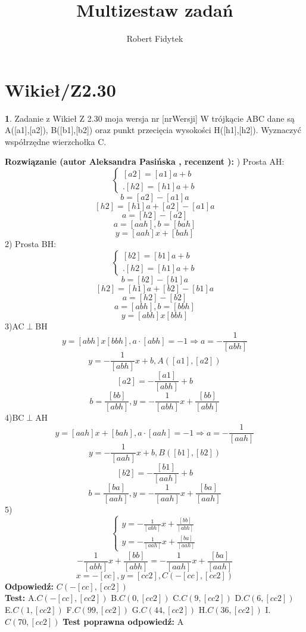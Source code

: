 \documentclass[12pt, a4paper]{article}
\title{Multizestaw zadań}
\author{Robert Fidytek}
\date{}
\theoremstyle{definition} %
\newtheorem{zad}{}
\newcommand{\kategoria}[1]{\section{#1}} %
\newcommand{\zadStart}[1]{\begin{zad}#1\newline} %
\newcommand{\zadStop}{\end{zad}}   %
\newcommand{\rozwStart}[2]{\noindent \textbf{Rozwiązanie (autor #1 , recenzent #2): }\newline} %
\newcommand{\rozwStop}{\newline}                                            %
\newcommand{\odpStart}{\noindent \textbf{Odpowiedź:}\newline}    %
\newcommand{\odpStop}{\newline}                                             %
\newcommand{\testStart}{\noindent \textbf{Test:}\newline} %
\newcommand{\testStop}{\newline} %
\newcommand{\kluczStart}{\noindent \textbf{Test poprawna odpowiedź:}\newline} %
\newcommand{\kluczStop}{\newline} %
\begin{document}
\maketitle


\kategoria{Wikieł/Z2.30}
\zadStart{Zadanie z Wikieł Z 2.30 moja wersja nr [nrWersji]}
W trójkącie ABC dane są A([a1],[a2]), B([b1],[b2]) oraz punkt przecięcia wysokości H([h1],[h2]). Wyznaczyć współrzędne wierzchołka C.
\zadStop
\rozwStart{Aleksandra Pasińska}{}
1) Prosta AH:
$$\left\{ \begin{array}{ll}
[a2]=[a1]a+b\\ 
.[h2]=[h1]a+b 
\end{array} \right.$$
$$b=[a2]-[a1]a$$
$$[h2]=[h1]a+[a2]-[a1]a$$
$$a=[h2]-[a2]$$
$$a=[aah], b=[bah]$$
$$y=[aah]x+[bah]$$
2) Prosta BH:
$$\left\{ \begin{array}{ll}
[b2]=[b1]a+b\\ 
.[h2]=[h1]a+b 
\end{array} \right.$$
$$b=[b2]-[b1]a$$
$$[h2]=[h1]a+[b2]-[b1]a$$
$$a=[h2]-[b2]$$
$$a=[abh], b=[bbh]$$
$$y=[abh]x[bbh]$$
3)AC$\perp$BH
$$y=[abh]x[bbh],a\cdot [abh]=-1\Rightarrow a=-\frac{1}{[abh]}$$
$$y=-\frac{1}{[abh]}x+b, A([a1],[a2])$$
$$[a2]=-\frac{[a1]}{[abh]}+b$$
$$b=\frac{[bb]}{[abh]},y=-\frac{1}{[abh]}x+\frac{[bb]}{[abh]}$$
4)BC$\perp$AH
$$y=[aah]x+[bah],a\cdot [aah]=-1\Rightarrow a=-\frac{1}{[aah]}$$
$$y=-\frac{1}{[aah]}x+b, B([b1],[b2])$$
$$[b2]=-\frac{[b1]}{[aah]}+b$$
$$b=\frac{[ba]}{[aah]},y=-\frac{1}{[aah]}x+\frac{[ba]}{[aah]}$$
5) $$\left\{ \begin{array}{ll}
y=-\frac{1}{[abh]}x+\frac{[bb]}{[abh]}\\ 
y=-\frac{1}{[aah]}x+\frac{[ba]}{[aah]}
\end{array} \right.$$
$$-\frac{1}{[abh]}x+\frac{[bb]}{[abh]}=-\frac{1}{[aah]}x+\frac{[ba]}{[aah]}$$
$$x=-[cc], y=[cc2], C(-[cc],[cc2])$$
\rozwStop
\odpStart
$C(-[cc],[cc2])$\\
\odpStop
\testStart
A.$ C(-[cc],[cc2])$
B.$ C(0,[cc2])$
C.$ C(9,[cc2])$
D.$ C(6,[cc2])$
E.$ C(1,[cc2])$
F.$ C(99,[cc2])$
G.$ C(44,[cc2])$
H.$ C(36,[cc2])$
I.$ C(70,[cc2])$
\testStop
\kluczStart
A
\kluczStop
\end{document}
